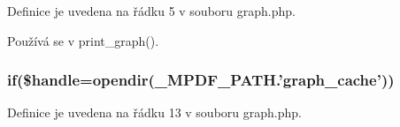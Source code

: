 Definice je uvedena na řádku 5 v souboru graph.\-php.



Používá se v print\-\_\-graph().

\hypertarget{graph_8php_a368310d17803f3aa751afb5a74c208db}{
\subsubsection[{if}]{\setlength{\rightskip}{0pt plus 5cm}if(\$handle=opendir(\-\_\-\-M\-P\-D\-F\-\_\-\-P\-A\-T\-H.'graph\-\_\-cache'))}}\label{graph_8php_a368310d17803f3aa751afb5a74c208db}


Definice je uvedena na řádku 13 v souboru graph.\-php.

